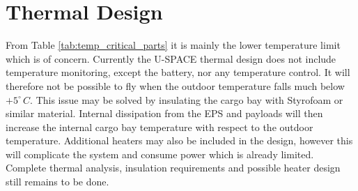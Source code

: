 \section{Thermal Design}
From Table \ref{tab:temp_critical_parts} it is mainly the lower temperature limit which is of concern. Currently the \ac{U-SPACE} thermal design does not include temperature monitoring, except the battery, nor any temperature control. It will therefore not be possible to fly when the outdoor temperature falls much below $+5^{\circ}\,C$. This issue may be solved by insulating the cargo bay with Styrofoam or similar material. Internal dissipation from the \ac{EPS} and payloads will then increase the internal cargo bay temperature with respect to the outdoor temperature. Additional heaters may also be included in the design, however this will complicate the system and consume power which is already limited.\\[5mm]
Complete thermal analysis, insulation requirements and possible heater design still remains to be done.
%